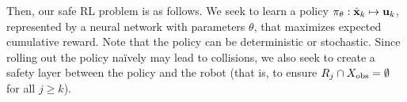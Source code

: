 Then, our safe RL problem is as follows.
We seek to learn a policy $\pi_\theta: \hat{{\mathbf{x}}}_{k} \mapsto {\mathbf{u}}_{k}$, represented by a neural network with parameters $\theta$, that maximizes expected cumulative reward.
Note that the policy can be deterministic or stochastic.
Since rolling out the policy na\"ively may lead to collisions, we also seek to create a safety layer between the policy and the robot (that is, to ensure $R_j \cap X_{\mathrm{\textnormal{obs}}} = \emptyset$ for all $j \geq k$).

